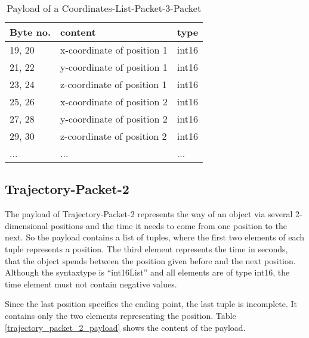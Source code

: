 \begin{table}[htdp]
  \begin{center}
    \begin{tabular}{l|l|l}
      \textbf{Byte no.} & \textbf{content} & \textbf{type} \\
      \hline
      \hline
      19, 20 & x-coordinate of position 1 & int16 \\
      \hline
      21, 22 & y-coordinate of position 1 & int16 \\
      \hline
      23, 24 & z-coordinate of position 1 & int16 \\
      \hline
      25, 26 & x-coordinate of position 2 & int16 \\
      \hline
      27, 28 & y-coordinate of position 2 & int16 \\
      \hline
      29, 30 & z-coordinate of position 2 & int16 \\
      \hline
      ... & ... & ... \\
    \end{tabular}
  \end{center}
  \caption{Payload of a Coordinates-List-Packet-3-Packet}
  \label{coordinates_list_packet_3_payload}
\end{table}

\subsection{Trajectory-Packet-2}
\label{subsection:trajectory2d}

The payload of Trajectory-Packet-2 represents the way of an object via several 2-dimensional positions and the time it needs
to come from one position to the next. So the payload contains a list of tuples, where the first two elements of each tuple
represents a position. The third element represents the time in seconds, that the object spends between the position given 
before and the next position. Although the syntaxtype is ``int16List'' and all elements are of type int16, the time
element must not contain negative values.

Since the last position specifies the ending point, the last tuple is incomplete. It contains only the two elements
representing the position. Table \ref{trajectory_packet_2_payload} shows the content of the payload.

